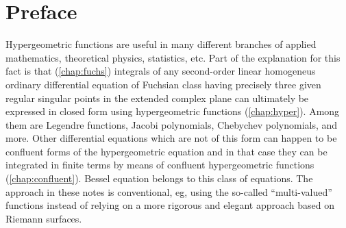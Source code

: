 \chapter*{Preface}

Hypergeometric functions  are useful in many different branches of applied
mathematics, theoretical physics, statistics, etc.  Part of the  explanation for
this fact is that (\cref{chap:fuchs}) integrals of any
second-order linear homogeneus ordinary differential equation of Fuchsian class
having precisely three given regular singular points in the extended complex
plane can ultimately be expressed in closed form using hypergeometric
functions (\cref{chap:hyper}). Among them are Legendre
functions, Jacobi polynomials, Chebychev polynomials, and more.  Other differential
equations which are not of this form can happen to 
be confluent forms of the hypergeometric equation and in that case
they can be integrated in finite terms by means of confluent hypergeometric
functions (\cref{chap:confluent}). Bessel equation belongs to this class of
equations. The approach in these notes is conventional, eg, using the so-called ``multi-valued'' functions instead of relying on a more rigorous and elegant approach based on Riemann surfaces.

\smallskip

\noindent\textsw{\myLocation, \myTime}


\begin{flushright}
        \myName
\end{flushright}

